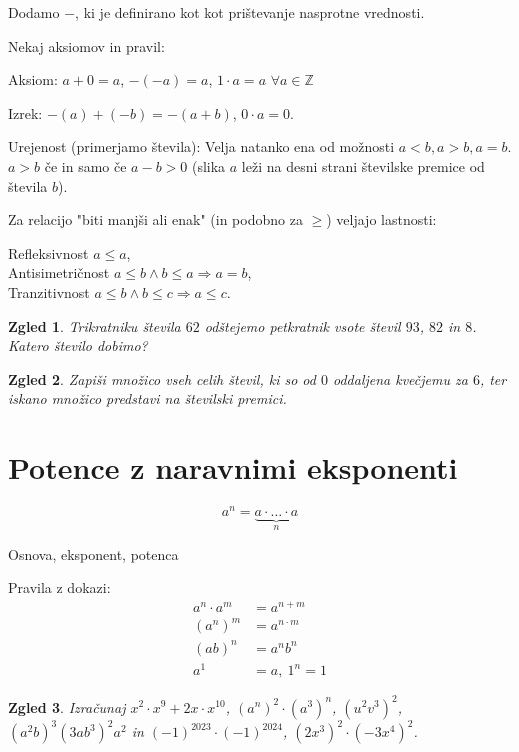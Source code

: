 \documentclass{article}
\newtheorem*{zgled}{Zgled}
\begin{document}
Dodamo $-$, ki je definirano kot kot prištevanje nasprotne vrednosti.

Nekaj aksiomov in pravil:

Aksiom: $a+0=a$, $-(-a)=a$, $1\cdot a =a$ $\forall a\in\mathbb{Z}$

Izrek: $-(a)+(-b)=-(a+b)$, $0\cdot a =0$.

Urejenost (primerjamo števila): Velja natanko ena od možnosti $a<b,a>b,a=b$. $a>b$ če in samo če $a-b>0$ (slika $a$ leži na desni strani številske premice od števila $b$).

Za relacijo "biti manjši ali enak" (in podobno za $\geq$) veljajo lastnosti:

Refleksivnost $a\leq a$,\\
Antisimetričnost $a\leq b \land b\leq a \Rightarrow a=b$,\\
Tranzitivnost $a\leq b \land b\leq c \Rightarrow a\leq c$.


\begin{zgled}
    Trikratniku števila $62$ odštejemo petkratnik vsote števil $93$, $82$ in $8$. Katero število dobimo?
\end{zgled}

\begin{zgled}
    Zapiši množico vseh celih števil, ki so od $0$ oddaljena kvečjemu za $6$, ter iskano množico predstavi na številski premici.
\end{zgled}

\section{Potence z naravnimi eksponenti}

\[a^n=\underbrace{a\cdot\ldots\cdot a}_{n}\]

Osnova, eksponent, potenca

Pravila z dokazi:
\begin{align*} 
a^n\cdot a^m &=a^{n+m}\\
\left(a^n\right)^m&=a^{n\cdot m}\\
\left(ab\right)^n&=a^n b^n\\
a^1&=a, \ 1^n = 1
\end{align*}

\begin{zgled}
    Izračunaj $x^2 \cdot x^9 +2x\cdot x^{10}$, $\left(a^n\right)^2\cdot\left(a^3 \right)^n$, $\left(u^2v^3\right)^2$, $\left(a^2b\right)^3\left(3ab^3\right)^2a^2$ in $(-1)^{2023}\cdot (-1)^{2024}$, $(2x^3)^2\cdot (-3x^4)^2$.
\end{zgled}
\end{document}
